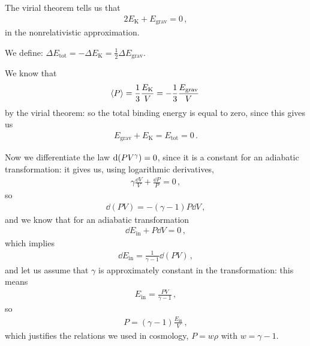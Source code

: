 \documentclass[main.tex]{subfiles}
\begin{document}


The virial theorem tells us that 
%
\begin{align}
  2 E _{\text{K}} + E _{\text{grav}} = 0
\,,
\end{align}
%
in the nonrelativistic approximation. 

We define: \(\Delta E _{\text{tot}} = - \Delta E _{\text{K}} = \frac{1}{2} \Delta E _{\text{grav}}\). 

We know that 
%
\begin{align}
  \expval{P} = \frac{1}{3} \frac{E _{\text{K}}}{V} = -\frac{1}{3} \frac{E _{\text{grav}}}{V}
\,
\end{align}
%
by the virial theorem: so the total binding energy is equal to zero, since this gives us 
%
\begin{align}
  E _{\text{grav}} + E _{\text{K}} = E _{\text{tot}} = 0
\,.
\end{align}
%

Now we differentiate the law \(\dd \qty(P V^{\gamma }) = 0\), since it is a constant for an adiabatic transformation: it gives us, using logarithmic derivatives, 
%
\begin{align}
  \gamma \frac{ \dd{V}}{V} + \frac{ \dd{P}}{P} = 0
\,,
\end{align}
%
so 
%
\begin{align}
  \dd{(PV)} = - (\gamma -1 ) P \dd{V}
\,,
\end{align}
%
and we know that for an adiabatic transformation 
%
\begin{align}
  \dd{E _{\text{in}}} + P \dd{V} = 0
\,,
\end{align}
%
which implies 
%
\begin{align}
  \dd{E _{\text{in}}} = \frac{1}{\gamma -1} \dd{(PV)}
\,,
\end{align}
%
and let us assume that \(\gamma \) is approximately constant in the transformation: this means 
%
\begin{align}
  E _{\text{in}} = \frac{PV}{\gamma -1}
\,,
\end{align}
%
so 
%
\begin{align}
  P = (\gamma -1 ) \frac{E _{\text{in}}}{V}
\,,
\end{align}
%
which justifies the relations we used in cosmology, \(P = w \rho \) with \(w = \gamma -1\). 
\end{document}
